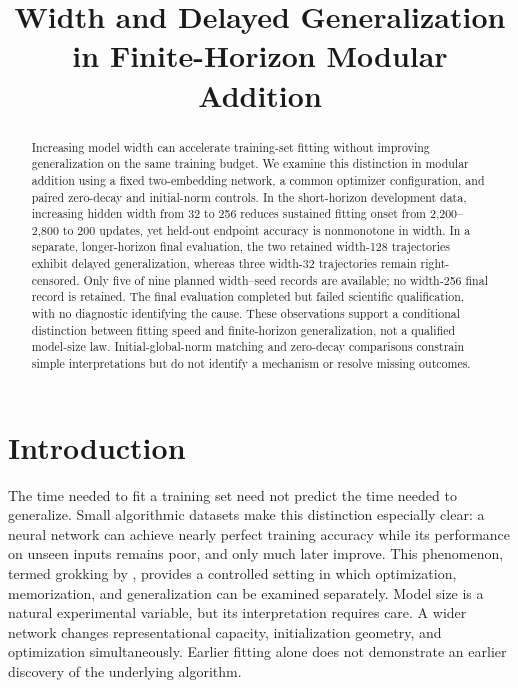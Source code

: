\documentclass{article}
\title{Width and Delayed Generalization in Finite-Horizon Modular Addition}
\author{}
\begin{document}
\maketitle

\begin{abstract}
Increasing model width can accelerate training-set fitting without improving generalization on the same training budget. We examine this distinction in modular addition using a fixed two-embedding network, a common optimizer configuration, and paired zero-decay and initial-norm controls. In the short-horizon development data, increasing hidden width from 32 to 256 reduces sustained fitting onset from 2,200--2,800 to 200 updates, yet held-out endpoint accuracy is nonmonotone in width. In a separate, longer-horizon final evaluation, the two retained width-128 trajectories exhibit delayed generalization, whereas three width-32 trajectories remain right-censored. Only five of nine planned width--seed records are available; no width-256 final record is retained. The final evaluation completed but failed scientific qualification, with no diagnostic identifying the cause. These observations support a conditional distinction between fitting speed and finite-horizon generalization, not a qualified model-size law. Initial-global-norm matching and zero-decay comparisons constrain simple interpretations but do not identify a mechanism or resolve missing outcomes.
\end{abstract}

\section{Introduction}
The time needed to fit a training set need not predict the time needed to generalize. Small algorithmic datasets make this distinction especially clear: a neural network can achieve nearly perfect training accuracy while its performance on unseen inputs remains poor, and only much later improve. This phenomenon, termed grokking by \citet{Power2022GrokkingGB}, provides a controlled setting in which optimization, memorization, and generalization can be examined separately. Model size is a natural experimental variable, but its interpretation requires care. A wider network changes representational capacity, initialization geometry, and optimization simultaneously. Earlier fitting alone does not demonstrate an earlier discovery of the underlying algorithm.
\end{document}
